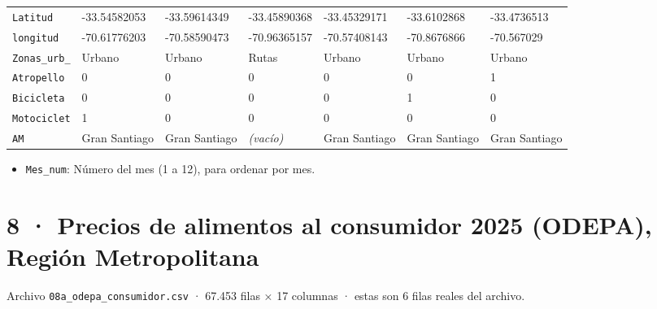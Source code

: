 \documentclass[10pt]{article}
\begin{document}
\begin{xltabular}{\linewidth}{@{}p{4.3cm} Y Y Y Y Y Y @{}}
\texttt{Latitud} & -{}33.54582053 & -{}33.59614349 & -{}33.45890368 & -{}33.45329171 & -{}33.6102868 & -{}33.4736513 \\
\texttt{longitud} & -{}70.61776203 & -{}70.58590473 & -{}70.96365157 & -{}70.57408143 & -{}70.8676866 & -{}70.567029 \\
\texttt{Zonas\_\allowbreak{}urb\_\allowbreak{}} & Urbano & Urbano & Rutas & Urbano & Urbano & Urbano \\
\texttt{Atropello} & 0 & 0 & 0 & 0 & 0 & 1 \\
\texttt{Bicicleta} & 0 & 0 & 0 & 0 & 1 & 0 \\
\texttt{Motociclet} & 1 & 0 & 0 & 0 & 0 & 0 \\
\texttt{AM} & Gran Santiago & Gran Santiago & \textit{\color{gris}(vacío)} & Gran Santiago & Gran Santiago & Gran Santiago \\
\end{xltabular}
\normalsize

\begin{alertabox}
\begin{itemize}[leftmargin=1.4em,itemsep=2pt,topsep=2pt]
\item \texttt{Mes\_\allowbreak{}num}: Número del mes (1 a 12), para ordenar por mes.
\end{itemize}
\end{alertabox}

\clearpage
\hypertarget{base8}{}
\section{8 · Precios de alimentos al consumidor 2025 (ODEPA), Región Metropolitana}
\small Archivo \texttt{08a\_odepa\_consumidor.csv} · 67.453 filas × 17 columnas · estas son 6 filas reales del archivo.\normalsize
\end{document}
